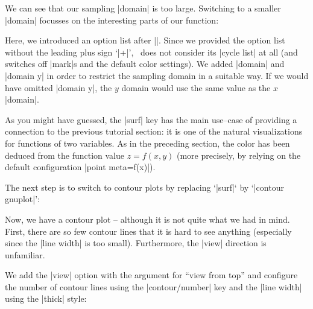 We can see that our sampling |domain| is too large. Switching to a smaller |domain| focusses on the interesting parts of our function:

\pgfplotsexpensiveexample
\begin{codeexample}[]
\end{codeexample}
Here, we introduced an option list after ||. Since we provided the option list without the leading plus sign `|+|', \PGFPlots\ does not consider its |cycle list| at all (and switches off |mark|s and the default color settings). We added |domain| and |domain y| in order to restrict the sampling domain in a suitable way. If we would have omitted |domain y|, the $y$ domain would use the same value as the $x$ |domain|.

As you might have guessed, the |surf| key has the main use--case of providing a connection to the previous tutorial section: it is one of the natural visualizations for functions of two variables. As in the preceding section, the color has been deduced from the function value $z=f(x,y)$ (more precisely, by relying on the default configuration |point meta=f(x)|).

The next step is to switch to contour plots by replacing `|surf|` by `|contour gnuplot|':

\pgfplotsexpensiveexample
\begin{codeexample}[]
\end{codeexample}
Now, we have a contour plot -- although it is not quite what we had in mind. First, there are so few contour lines that it is hard to see anything (especially since the |line width| is too small). Furthermore, the |view| direction is unfamiliar.

We add the |view| option with the argument for ``view from top'' and configure the number of contour lines using the |contour/number| key and the |line width| using the |thick| style:

